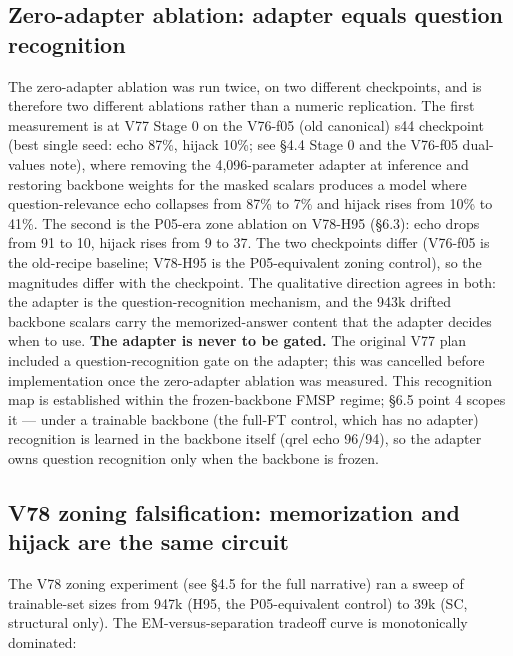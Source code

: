 \documentclass[11pt]{article}
\begin{document}
\subsection{Zero-adapter ablation: adapter equals question recognition}

The zero-adapter ablation was run twice, on two different checkpoints, and is therefore two different ablations rather than a numeric replication. The first measurement is at V77 Stage 0 on the V76-f05 (old canonical) s44 checkpoint (best single seed: echo 87\%, hijack 10\%; see \S4.4 Stage 0 and the V76-f05 dual-values note), where removing the 4{,}096-parameter adapter at inference and restoring backbone weights for the masked scalars produces a model where question-relevance echo collapses from 87\% to 7\% and hijack rises from 10\% to 41\%. The second is the P05-era zone ablation on V78-H95 (\S6.3): echo drops from 91 to 10, hijack rises from 9 to 37. The two checkpoints differ (V76-f05 is the old-recipe baseline; V78-H95 is the P05-equivalent zoning control), so the magnitudes differ with the checkpoint. The qualitative direction agrees in both: the adapter is the question-recognition mechanism, and the 943k drifted backbone scalars carry the memorized-answer content that the adapter decides when to use. \textbf{The adapter is never to be gated.} The original V77 plan included a question-recognition gate on the adapter; this was cancelled before implementation once the zero-adapter ablation was measured. This recognition map is established within the frozen-backbone FMSP regime; \S6.5 point 4 scopes it --- under a trainable backbone (the full-FT control, which has no adapter) recognition is learned in the backbone itself (qrel echo 96/94), so the adapter owns question recognition only when the backbone is frozen.

\subsection{V78 zoning falsification: memorization and hijack are the same circuit}

The V78 zoning experiment (see \S4.5 for the full narrative) ran a sweep of trainable-set sizes from 947k (H95, the P05-equivalent control) to 39k (SC, structural only). The EM-versus-separation tradeoff curve is monotonically dominated:
\end{document}
